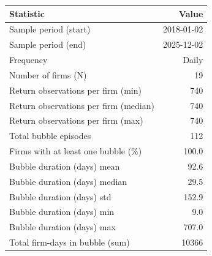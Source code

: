 \begin{tabular}{p{} r}
\toprule
Statistic & Value \\
\midrule
Sample period (start) & 2018-01-02 \\
Sample period (end) & 2025-12-02 \\
Frequency & Daily \\
Number of firms (N) & 19 \\
Return observations per firm (min) & 740 \\
Return observations per firm (median) & 740 \\
Return observations per firm (max) & 740 \\
Total bubble episodes & 112 \\
Firms with at least one bubble (\%) & 100.0 \\
Bubble duration (days) mean & 92.6 \\
Bubble duration (days) median & 29.5 \\
Bubble duration (days) std & 152.9 \\
Bubble duration (days) min & 9.0 \\
Bubble duration (days) max & 707.0 \\
Total firm-days in bubble (sum) & 10366 \\
\bottomrule
\end{tabular}
